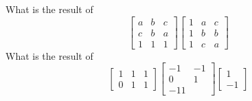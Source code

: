 \eexo
{}

\bexo
What is the result of 
\begin{equation*}
\left[
\begin{array}{ccc}
a & b & c\\
c & b & a\\
1 & 1 & 1
\end{array}
\right]
\left[
\begin{array}{ccc}
1 & a & c\\
1 & b & b\\
1 & c & a
\end{array}
\right]
\end{equation*}
\eexo
{}
\bexo
What is the result of 
\begin{equation*}
\left[
\begin{array}{ccc}
1& 1& 1\\
0& 1& 1
\end{array}
\right]
\left[
\begin{array}{cc}
-1& -1\\
0& 1\\
-1 1
\end{array}
\right]
\left[
\begin{array}{c}
1\\
-1
\end{array}
\right]
\end{equation*}

